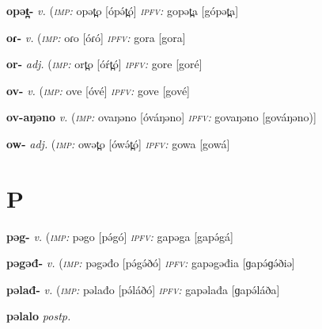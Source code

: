 {\newentry
\headword\textbf{opət̪-}  
\ipa{[ópət̪-]}
\synpos\textit{v.} 
\imperative(\textit {\textsc{imp:}} opət̪o [ópə́t̪ó]
\imperfective\textit{\textsc{ipfv:}} gopət̪a [gópət̪a]

\newentry
\headword\textbf{oɾ-}  
\ipa{[oɾ-]}
\synpos\textit{v.} 
\imperative(\textit {\textsc{imp:}} oɾo [óɾó]
\imperfective\textit{\textsc{ipfv:}} gora [gora]

\newentry
\headword\textbf{or-}  
\ipa{[or-]}
\synpos\textit{adj.} 
\imperative(\textit {\textsc{imp:}} ort̪o [óŕt̪ó]
\imperfective\textit{\textsc{ipfv:}} gore [goré]

\newentry
\headword\textbf{ov-}  
\ipa{[ov-]}
\synpos\textit{v.} 
\imperative(\textit {\textsc{imp:}} ove [óvé]
\imperfective\textit{\textsc{ipfv:}} gove [gové]

\newentry
\headword\textbf{ov-aŋəno}  
\ipa{[ov-áŋəno]}
\synpos\textit{v.} 
\imperative(\textit {\textsc{imp:}} ovaŋəno [óváŋəno]
\imperfective\textit{\textsc{ipfv:}} govaŋəno [gováŋəno)]

\newentry
\headword\textbf{ow-}  
\ipa{[ow-]}
\synpos\textit{adj.} 
\imperative(\textit {\textsc{imp:}} owət̪o [ówə́t̪ó]
\imperfective\textit{\textsc{ipfv:}} gowa [gowá]

\section*{P}\label{P}

\newentry
\headword\textbf{pəg-}  
\ipa{[pə́g-]}
\synpos\textit{v.} 
\imperative(\textit {\textsc{imp:}} pəgo [pə́gó]
\imperfective\textit{\textsc{ipfv:}} gapəga [gapə́gá]

\newentry
\headword\textbf{pəgəđ-}  
\ipa{[pə́gə́ð-]}
\synpos\textit{v.} 
\imperative(\textit {\textsc{imp:}} pəgəđo [pə́gə́ðó]
\imperfective\textit{\textsc{ipfv:}} gapəgəđia [ɡapə́ɡə́ðiə]

\newentry
\headword\textbf{pəlađ-}  
\ipa{[pə́láð-]}
\synpos\textit{v.} 
\imperative(\textit {\textsc{imp:}} pəlađo [pə́láðó]
\imperfective\textit{\textsc{ipfv:}} gapəlađa [ɡapə́láða]

\newentry
\headword\textbf{pəlalo}  
\ipa{[pəlalo]}
\synpos\textit{postp.} 

}
